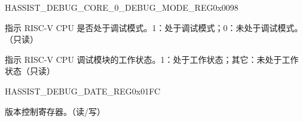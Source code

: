\begin{register}{H}{ASSIST\_DEBUG\_CORE\_0\_DEBUG\_MODE\_REG}{0x0098}\label{regdesc:ASSISTDEBUGCORE0DEBUGMODEREG}
%
%
%
\regnewline%
\begin{regdesc}\begin{reglist}
\label{fielddesc:ASSISTDEBUGCORE0DEBUGMODE}\item [ASSIST\_DEBUG\_CORE\_0\_DEBUG\_MODE] 指示 RISC-V CPU 是否处于调试模式。1：处于调试模式；0：未处于调试模式。（只读）
\label{fielddesc:ASSISTDEBUGCORE0DEBUGMODULEACTIVE}\item [ASSIST\_DEBUG\_CORE\_0\_DEBUG\_MODULE\_ACTIVE] 指示 RISC-V CPU 调试模块的工作状态。1：处于工作状态；其它：未处于工作状态（只读）
\end{reglist}\end{regdesc}
\end{register}


\begin{register}{H}{ASSIST\_DEBUG\_DATE\_REG}{0x01FC}\label{regdesc:ASSISTDEBUGDATEREG}
%
%
\regnewline%
\begin{regdesc}\begin{reglist}
\label{fielddesc:ASSISTDEBUGDATE}\item [ASSIST\_DEBUG\_\_DATE] 版本控制寄存器。（读/写）
\end{reglist}\end{regdesc}
\end{register}
